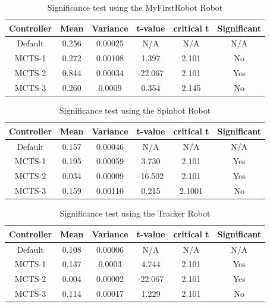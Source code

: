 \begin{table}
\begin{center}
\renewcommand{\arraystretch}{1}
\caption{Significance test using the MyFirstRobot Robot}
\label{table-MFS-significance}
\begin{tabular}{|c | c | c |c | c | c |}
\hline
Controller & Mean & Variance & t-value & critical t & Significant\\
\hline
Default & 0.256 & 0.00025 & N/A & N/A & N/A\\
\hline
MCTS-1 & 0.272 & 0.00108 & 1.397 & 2.101 & No\\
\hline
MCTS-2 & 0.844 & 0.00034 & -22.067 & 2.101 & Yes\\
\hline
MCTS-3 & 0.260 & 0.0009 & 0.354 & 2.145 & No\\
\hline
\end{tabular}
\end{center}
\end{table}

\begin{table}
\begin{center}
\renewcommand{\arraystretch}{1}
\caption{Significance test using the Spinbot Robot}
\label{table-spinbot-significance}
\begin{tabular}{|c | c | c |c | c | c |}
\hline
Controller & Mean & Variance & t-value & critical t & Significant\\
\hline
Default & 0.157 & 0.00046 & N/A & N/A & N/A\\
\hline
MCTS-1 & 0.195 & 0.00059 & 3.730 & 2.101 & Yes\\
\hline
MCTS-2 & 0.034 & 0.00009 & -16.502 & 2.101 & Yes\\
\hline
MCTS-3 & 0.159 & 0.00110 & 0.215 & 2.1001& No\\
\hline
\end{tabular}
\end{center}
\end{table}

\begin{table}
\begin{center}
\renewcommand{\arraystretch}{1}
\caption{Significance test using the Tracker Robot}
\label{table-tracker-significance}
\begin{tabular}{|c | c | c |c | c | c |}
\hline
Controller & Mean & Variance & t-value & critical t & Significant\\
\hline
Default & 0.108 & 0.00006 & N/A & N/A & N/A\\
\hline
MCTS-1 & 0.137 & 0.0003 & 4.744 & 2.101 & Yes\\
\hline
MCTS-2 & 0.004 & 0.00002 & -22.067 & 2.101 & Yes\\
\hline
MCTS-3 & 0.114 & 0.00017 & 1.229 & 2.101 & No\\
\hline
\end{tabular}
\end{center}
\end{table}

